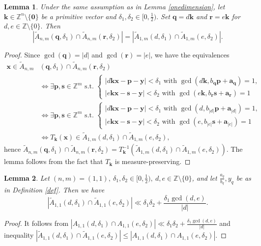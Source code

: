\documentclass[reqno]{amsart}
\newtheorem{lemma}{Lemma}
\theoremstyle{definition}
\theoremstyle{remark}
\begin{document}
\begin{lemma}\label{intersection}
    Under the same assumption as in Lemma \ref{onedimension}, let $\mathbf{k} \in \mathbb{Z}^n \setminus \{\mathbf{0}\}$ be a primitive vector and $\delta_1, \delta_2 \in [0,\frac{1}{2}).$ Set $\mathbf{q} = d\mathbf{k}$ and $\mathbf{r}=e \mathbf{k}$ for $d, e \in \mathbb{Z}\setminus \{0\}.$ Then
    $$|\tilde A_{n,m}(\mathbf q,\delta_1) \cap \tilde A_{n,m}(\mathbf r, \delta_2)| = |\tilde A_{1,m}(d, \delta_1) \cap \tilde A_{1,m}(e, \delta_2)|.$$
\end{lemma}
\begin{proof}
    Since $\gcd(\mathbf{q}) = |d|$ and $\gcd(\mathbf{r}) = |e|$, we have the equivalences
    \begin{align*}
        \mathbf{x} \in \tilde{A}_{n,m}&(\mathbf{q}, \delta_1) \cap \tilde{A}_{n,m}(\mathbf{r}, \delta_2) \\
        &\Leftrightarrow \exists \mathbf{p}, \mathbf{s}\in \mathbb{Z}^m \text{ s.t. } \begin{cases} |d\mathbf{kx} - \mathbf{p} - \mathbf{y}| < \delta_1 \text{ with } \gcd(d\mathbf{k}, b_\mathbf{q}\mathbf{p} + \mathbf{a}_\mathbf{q}) = 1, \\ |e\mathbf{kx} - \mathbf{s} - \mathbf{y}| < \delta_2 \text{ with } \gcd(e\mathbf{k}, b_\mathbf{r}\mathbf{s} + \mathbf{a}_\mathbf{r}) = 1 \end{cases} \\
        &\Leftrightarrow \exists \mathbf{p}, \mathbf{s}\in \mathbb{Z}^m \text{ s.t. } \begin{cases} |d\mathbf{kx} - \mathbf{p} - \mathbf{y}| < \delta_1 \text{ with } \gcd(d, b_{|d|} \mathbf{p} + \mathbf{a}_{|d|}) = 1, \\ |e\mathbf{kx} - \mathbf{s} - \mathbf{y}| < \delta_2 \text{ with } \gcd(e, b_{|e|} \mathbf{s} + \mathbf{a}_{|e|}) = 1 \end{cases} \\
        &\Leftrightarrow T_\mathbf{k}(\mathbf{x}) \in \tilde A_{1,m}(d, \delta_1) \cap \tilde A_{1,m}(e, \delta_2),
    \end{align*}
    hence $\tilde A_{n,m} (\mathbf q, \delta_1) \cap \tilde A_{n,m} (\mathbf r, \delta_2) = T_\mathbf{k}^{-1}(\tilde A_{1,m} (d,\delta_1) \cap \tilde A_{1,m}(e, \delta_2)).$ The lemma follows from the fact that $T_\mathbf{k}$ is measure-preserving.
\end{proof}

\begin{lemma}\label{basicineq}
    Let $(n,m)= (1,1),\ \delta_1, \delta_2 \in [0,\frac{1}{2}),\ d,e \in \mathbb{Z} \setminus \{0\}$, and let $\frac{a_q}{b_q}, y_q$ be as in Definition \ref{def}. Then we have
    $$|\tilde A_{1,1}(d, \delta_1) \cap \tilde A_{1,1}(e, \delta_2)| \ll \delta_1 \delta_2 + \frac{\delta_1 \gcd(d,e)}{|d|}.$$
\end{lemma}
\begin{proof}
    It follows from $|A_{1,1}(d, \delta_1) \cap A_{1,1}(e, \delta_2)| \ll \delta_1 \delta_2 + \frac{\delta_1 \gcd(d,e)}{|d|}$ \cite[Lemma 8]{AR22} and inequality $|\tilde A_{1,1}(d, \delta_1) \cap \tilde A_{1,1}(e, \delta_2)| \leq |A_{1,1}(d, \delta_1) \cap A_{1,1}(e, \delta_2)|.$
\end{proof}
\end{document}
